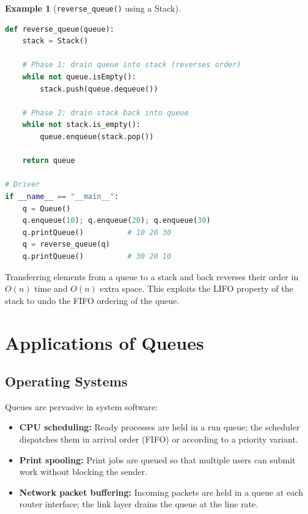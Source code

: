 \documentclass[11pt, a4paper, notitlepage]{report}
\theoremstyle{definition}
\theoremstyle{remark}
\theoremstyle{definition}
\newtheorem{example}[theorem]{Example}
\begin{document}
\begin{example}[\texttt{reverse\_queue()} using a Stack]
\label{ex:queue-reverse}
\leavevmode
\begin{lstlisting}[language=Python]
def reverse_queue(queue):
    stack = Stack()

    # Phase 1: drain queue into stack (reverses order)
    while not queue.isEmpty():
        stack.push(queue.dequeue())

    # Phase 2: drain stack back into queue
    while not stack.is_empty():
        queue.enqueue(stack.pop())

    return queue

# Driver
if __name__ == "__main__":
    q = Queue()
    q.enqueue(10); q.enqueue(20); q.enqueue(30)
    q.printQueue()          # 10 20 30
    q = reverse_queue(q)
    q.printQueue()          # 30 20 10
\end{lstlisting}
\end{example}

\begin{keyresult}[title={Key Result: Stack as a Reversal Tool}]
Transferring elements from a queue to a stack and back reverses their order in $O(n)$ time and
$O(n)$ extra space.  This exploits the LIFO property of the stack to undo the FIFO ordering of
the queue.
\end{keyresult}


\section{Applications of Queues}
\label{sec:queue-apps}

\subsection{Operating Systems}
\label{subsec:queue-os}

Queues are pervasive in system software:
\begin{itemize}
  \item \textbf{CPU scheduling:} Ready processes are held in a run queue; the scheduler
        dispatches them in arrival order (FIFO) or according to a priority variant.
  \item \textbf{Print spooling:} Print jobs are queued so that multiple users can submit
        work without blocking the sender.
  \item \textbf{Network packet buffering:} Incoming packets are held in a queue at each
        router interface; the link layer drains the queue at the line rate.
\end{itemize}
\end{document}
